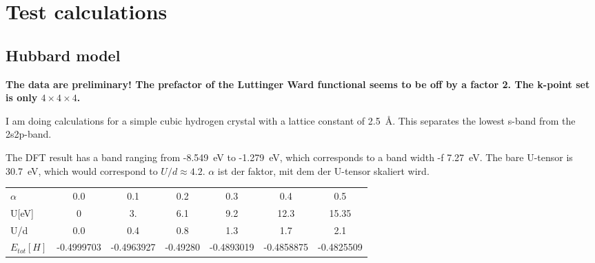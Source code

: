 \documentclass[11pt,a4paper]{report}
\begin{document}
\chapter{Test calculations}
\section{Hubbard model}

\textbf{The data are preliminary! The prefactor of the Luttinger Ward
  functional seems to be off by a factor 2. The k-point set is only
  $4\times4\times4$.}


I am doing calculations for a simple cubic hydrogen crystal with a
lattice constant of 2.5~\AA. This separates the lowest s-band from the
2s2p-band.

The DFT result has a band ranging from -8.549~eV to -1.279~eV, which
corresponds to a band width -f 7.27~eV.  The bare U-tensor is 30.7~eV,
which would correspond to $U/d\approx 4.2$. $\alpha$ ist der faktor,
mit dem der U-tensor skaliert wird.
\begin{center}
\begin{tabular}{|l|c|c|c|c|c|c|}
\hline
$\alpha$ & 0.0 & 0.1 & 0.2 & 0.3 & 0.4 & 0.5 \\
U[eV] & 0 & 3. & 6.1 & 9.2 & 12.3 &  15.35\\
U/d & 0.0 & 0.4 & 0.8 & 1.3 & 1.7 & 2.1\\
\hline
$E_{tot}[H]$ & -0.4999703 &-0.4963927 &  -0.49280 &  -0.4893019 & -0.4858875 &-0.4825509\\
\hline
\end{tabular}
\end{center}
\end{document}
